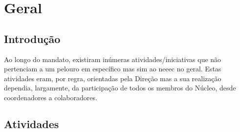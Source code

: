 
\section{Geral}

\subsection{Introdução}

Ao longo do mandato, existiram inúmeras atividades/iniciativas que não pertenciam a um pelouro em específico mas sim ao \acrshort{neeec} no geral. Estas atividades eram, por regra, orientadas pela Direção mas a sua realização dependia, largamente, da participação de todos os membros do Núcleo, desde coordenadores a colaboradores.

\subsection{Atividades}









{ %
    
}
{ %

}







